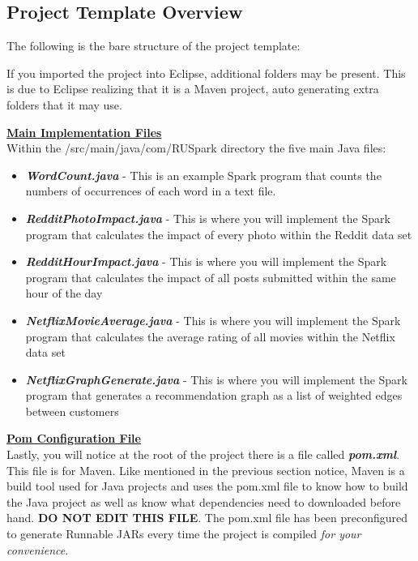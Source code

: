 \documentclass{article}
\begin{document}
\subsection{Project Template Overview}

The following is the bare structure of the project template: \\


\begin{info}[Notice:]
If you imported the project into Eclipse, additional folders may be present. This is due to Eclipse realizing that it is a Maven project, auto generating extra folders that it may use.
\end{info}

\noindent \textbf{\underline{Main Implementation Files}} \vspace{0.2cm} \\
\noindent Within the /src/main/java/com/RUSpark directory the five main Java files:
\begin{itemize}
   \item \textbf{\textit{WordCount.java}} - This is an example Spark program that counts the numbers of occurrences of each word in a text file.
    \item \textbf{\textit{RedditPhotoImpact.java}} - This is where you will implement the Spark program that calculates the impact of every photo within the Reddit data set
    \item \textbf{\textit{RedditHourImpact.java}} - This is where you will implement the Spark program that calculates the impact of all posts submitted within the same hour of the day
    \item \textbf{\textit{NetflixMovieAverage.java}} - This is where you will implement the Spark program that calculates the average rating of all movies within the Netflix data set 
    \item \textbf{\textit{NetflixGraphGenerate.java}} - This is where you will implement the Spark program that generates a recommendation graph as a list of weighted edges between customers
\end{itemize}

\noindent \textbf{\underline{Pom Configuration File}} \vspace{0.2cm} \\
\noindent Lastly, you will notice at the root of the project there is a file called \textbf{\textit{pom.xml}}. This file is for Maven. Like mentioned in the previous section notice, Maven is a build tool used for Java projects and uses the pom.xml file to know how to build the Java project as well as know what dependencies need to downloaded before hand. \textbf{DO NOT EDIT THIS FILE}. The pom.xml file has been preconfigured to generate Runnable JARs every time the project is compiled \textit{for your convenience}. 
\end{document}
